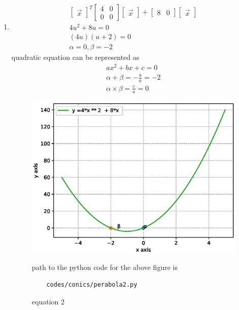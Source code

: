 \begin{enumerate}[label=\arabic*.,ref=\thesubsection.\theenumi]
\item
\begin{align}
\begin{bmatrix}\vec x\end{bmatrix}^T\begin{bmatrix}4 & 0\\0 & 0\end{bmatrix}\begin{bmatrix}\vec x\end{bmatrix} + \begin{bmatrix}8 & 0\end{bmatrix}\begin{bmatrix}\vec x\end{bmatrix} 
\\
4u^2 + 8u = 0
\\
\left(4u\right)\left(u+2\right) = 0
\\
\alpha = 0 ,\beta =-2 
\end{align}
quadratic equation can be represented as 
\begin{align}
ax^2+bx +c = 0
\\
\alpha +\beta = -\frac{b}{a} = -2
\\
\alpha \times \beta = \frac{c}{a} = 0
\end{align}
\begin{figure}[!ht]
	\centering
	\includegraphics[width=\columnwidth]{./figures/conics/perabola2.eps}
	\caption{equation 2 }
	\label{fig:perabola2}
	path to the python code for the above figure is 
	\begin{lstlisting}
	codes/conics/perabola2.py
	\end{lstlisting}
\end{figure}
 


\end{enumerate}
